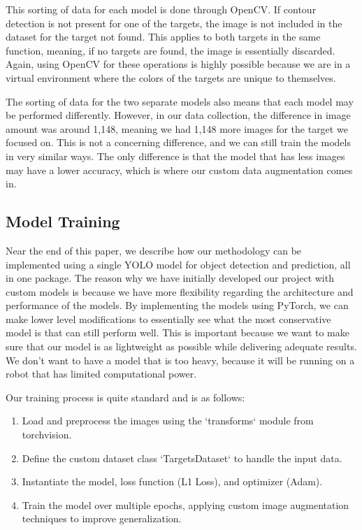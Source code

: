 

This sorting of data for each model is done through OpenCV. If contour detection is not present for one of the targets, the image is not included in the dataset for the target not found. This applies to both targets in the same function, meaning, if no targets are found, the image is essentially discarded. Again, using OpenCV for these operations is highly possible because we are in a virtual environment where the colors of the targets are unique to themselves.

The sorting of data for the two separate models also means that each model may be performed differently. However, in our data collection, the difference in image amount was around 1,148, meaning we had 1,148 more images for the target we focused on. This is not a concerning difference, and we can still train the models in very similar ways. The only difference is that the model that has less images may have a lower accuracy, which is where our custom data augmentation comes in.


\subsection{Model Training}
Near the end of this paper, we describe how our methodology can be implemented using a single YOLO model for object detection and prediction, all in one package. The reason why we have initially developed our project with custom models is because we have more flexibility regarding the architecture and performance of the models. By implementing the models using PyTorch, we can make lower level modifications to essentially see what the most conservative model is that can still perform well. This is important because we want to make sure that our model is as lightweight as possible while delivering adequate results. We don't want to have a model that is too heavy, because it will be running on a robot that has limited computational power.

Our training process is quite standard and is as follows:
\begin{enumerate}
    \item Load and preprocess the images using the `transforms` module from torchvision.
    \item Define the custom dataset class `TargetsDataset` to handle the input data.
    \item Instantiate the model, loss function (L1 Loss), and optimizer (Adam).
    \item Train the model over multiple epochs, applying custom image augmentation techniques to improve generalization.
\end{enumerate}

